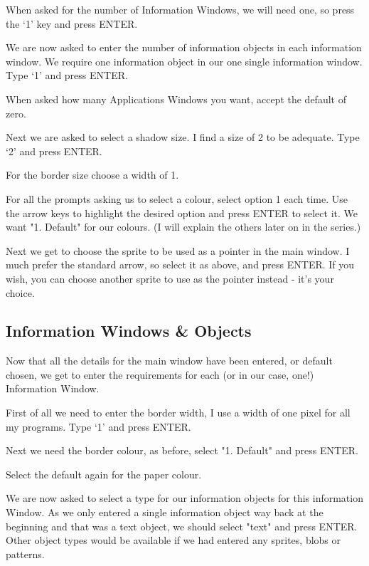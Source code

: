When asked for the number of Information Windows, we will need one, so
            press the `1' key and press ENTER.

We are now asked to enter the number of information objects in each
            information window. We require one information object in our one single
            information window. Type `1' and press ENTER.

When asked how many Applications Windows you want, accept the default of
            zero.

Next we are asked to select a shadow size. I find a size of 2 to be
            adequate. Type `2' and press ENTER.

For the border size choose a width of 1.

For all the prompts asking us to select a colour, select option 1 each
            time. Use the arrow keys to highlight the desired option and press ENTER to
            select it. We want "1. Default" for our colours. (I will explain the others
            later on in the series.)

Next we get to choose the sprite to be used as a pointer in the main
            window. I much prefer the standard arrow, so select it as above, and press
            ENTER. If you wish, you can choose another sprite to use as the pointer
            instead -{} it's your choice.

\subsection{Information Windows \& Objects}

Now that all the details for the main window have been entered, or
            default chosen, we get to enter the requirements for each (or in our case,
            one!) Information Window.

First of all we need to enter the border width, I use a width of one
            pixel for all my programs. Type `1' and press ENTER.

Next we need the border colour, as before, select "1. Default" and press
            ENTER.

Select the default again for the paper colour.

We are now asked to select a type for our information objects for this
            information Window. As we only entered a single information object way back at
            the beginning and that was a text object, we should select "text" and press
            ENTER. Other object types would be available if we had entered any sprites,
            blobs or patterns.

